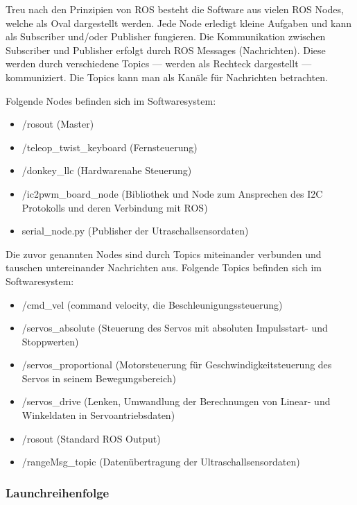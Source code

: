 \documentclass[conference]{IEEEtran}
\begin{document}
Treu nach den Prinzipien von ROS besteht die Software aus vielen ROS Nodes, welche als Oval dargestellt werden. 
Jede Node erledigt kleine Aufgaben und kann als Subscriber und/oder Publisher fungieren.
Die Kommunikation zwischen Subscriber und Publisher erfolgt durch ROS Messages (Nachrichten).
Diese werden durch verschiedene Topics — werden als Rechteck dargestellt — kommuniziert.
Die Topics kann man als Kanäle für Nachrichten betrachten.

Folgende Nodes befinden sich im Softwaresystem:
\begin{itemize}
	\item /rosout (Master)
	\item /teleop\_twist\_keyboard (Fernsteuerung)
	\item /donkey\_llc (Hardwarenahe Steuerung)
	\item /ic2pwm\_board\_node (Bibliothek und Node zum Ansprechen des I2C Protokolls und deren Verbindung mit ROS)
	\item serial\_node.py (Publisher der Utraschallsensordaten)
\end{itemize}

Die zuvor genannten Nodes sind durch Topics miteinander verbunden und tauschen untereinander Nachrichten aus.
Folgende Topics befinden sich im Softwaresystem:
\begin{itemize}
	\item /cmd\_vel (command velocity, die Beschleunigungssteuerung)
	\item /servos\_absolute (Steuerung des Servos mit absoluten Impulsstart- und Stoppwerten)
	\item /servos\_proportional (Motorsteuerung für Geschwindigkeitsteuerung des Servos in seinem Bewegungsbereich)
	\item /servos\_drive (Lenken, Umwandlung der Berechnungen von Linear- und Winkeldaten in Servoantriebsdaten)
	\item /rosout (Standard ROS Output)
	\item /rangeMsg\_topic (Datenübertragung der Ultraschallsensordaten)
\end{itemize}

\pagebreak
\subsubsection{Launchreihenfolge}%
\end{document}
